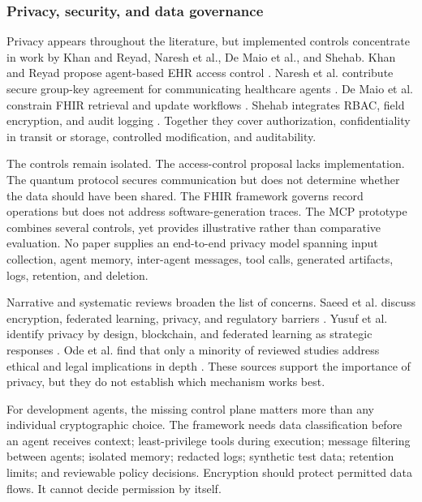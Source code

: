 \documentclass[11pt,a4paper]{article}
\begin{document}
\subsubsection{Privacy, security, and data governance}

Privacy appears throughout the literature, but implemented controls concentrate in work by Khan and Reyad, Naresh et al., De Maio et al., and Shehab. Khan and Reyad propose agent-based EHR access control \cite{khan2019ibac}. Naresh et al. contribute secure group-key agreement for communicating healthcare agents \cite{naresh2020quantum}. De Maio et al. constrain FHIR retrieval and update workflows \cite{demaio2025privacy}. Shehab integrates RBAC, field encryption, and audit logging \cite{shehab2025agentic}. Together they cover authorization, confidentiality in transit or storage, controlled modification, and auditability.

The controls remain isolated. The access-control proposal lacks implementation. The quantum protocol secures communication but does not determine whether the data should have been shared. The FHIR framework governs record operations but does not address software-generation traces. The MCP prototype combines several controls, yet provides illustrative rather than comparative evaluation. No paper supplies an end-to-end privacy model spanning input collection, agent memory, inter-agent messages, tool calls, generated artifacts, logs, retention, and deletion.

Narrative and systematic reviews broaden the list of concerns. Saeed et al. discuss encryption, federated learning, privacy, and regulatory barriers \cite[pp.~7--12]{saeed2025applications}. Yusuf et al. identify privacy by design, blockchain, and federated learning as strategic responses \cite[pp.~6--9]{yusuf2025systematic}. Ode et al. find that only a minority of reviewed studies address ethical and legal implications in depth \cite[pp.~4--7]{ode2025evidence}. These sources support the importance of privacy, but they do not establish which mechanism works best.

For development agents, the missing control plane matters more than any individual cryptographic choice. The framework needs data classification before an agent receives context; least-privilege tools during execution; message filtering between agents; isolated memory; redacted logs; synthetic test data; retention limits; and reviewable policy decisions. Encryption should protect permitted data flows. It cannot decide permission by itself.
\end{document}
